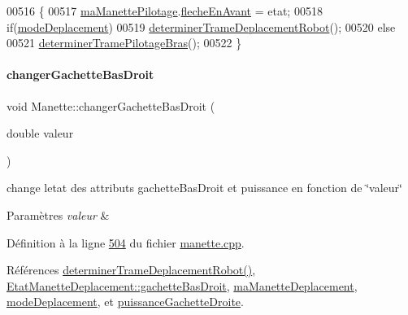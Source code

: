 \begin{DoxyCode}
00516 \{
00517     \hyperlink{class_manette_aeb3e02eaeaec4c656f78ed8fc6dae342}{maManettePilotage}.\hyperlink{struct_etat_manette_pilotage_a12429b457b51cb45cc9d405f3a01bea6}{flecheEnAvant} = etat;
00518     \textcolor{keywordflow}{if}(\hyperlink{class_manette_a4dc6231c8cc65fac03f59d323fa9a038}{modeDeplacement})
00519         \hyperlink{class_manette_a97a50caac68954a229c7e9461e7f4232}{determinerTrameDeplacementRobot}();
00520     \textcolor{keywordflow}{else}
00521         \hyperlink{class_manette_ab5eb6972f366aa7527b2b27da5539638}{determinerTramePilotageBras}();
00522 \}
\end{DoxyCode}
\mbox{\label{class_manette_aa3540dc97fd85153baf80b9e06e8565f}} 
\paragraph{\texorpdfstring{changer\+Gachette\+Bas\+Droit}{changerGachetteBasDroit}}
{\footnotesize\ttfamily void Manette\+::changer\+Gachette\+Bas\+Droit (\begin{DoxyParamCaption}\item[{double}]{valeur }\end{DoxyParamCaption})\hspace{0.3cm}{\ttfamily [slot]}}



change l\textquotesingle{}etat des attributs gachette\+Bas\+Droit et puissance en fonction de \char`\"{}valeur\char`\"{} 


\begin{DoxyParams}{Paramètres}
{\em valeur} & \\
\hline
\end{DoxyParams}


Définition à la ligne \hyperlink{manette_8cpp_source_l00504}{504} du fichier \hyperlink{manette_8cpp_source}{manette.\+cpp}.



Références \hyperlink{manette_8cpp_source_l00341}{determiner\+Trame\+Deplacement\+Robot()}, \hyperlink{manette_8h_source_l00185}{Etat\+Manette\+Deplacement\+::gachette\+Bas\+Droit}, \hyperlink{manette_8h_source_l00220}{ma\+Manette\+Deplacement}, \hyperlink{manette_8h_source_l00253}{mode\+Deplacement}, et \hyperlink{manette_8h_source_l00255}{puissance\+Gachette\+Droite}.


